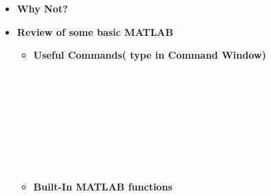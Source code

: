 \documentclass[11pt]{article}
\begin{document}
\begin{itemize}
\item \textbf{\LARGE Why Not?}
\newpage

\item \textbf{\LARGE Review of some basic MATLAB}

	\begin{itemize}

		\item \textbf{ \LARGE Useful Commands( type in Command Window)}\\

		
			 \\\\
			 \\\\
			 \\\\
			 \\\\



		\item \textbf{ \LARGE Built-In MATLAB functions}\\
	

\end{itemize}
\end{itemize}
\end{document}
